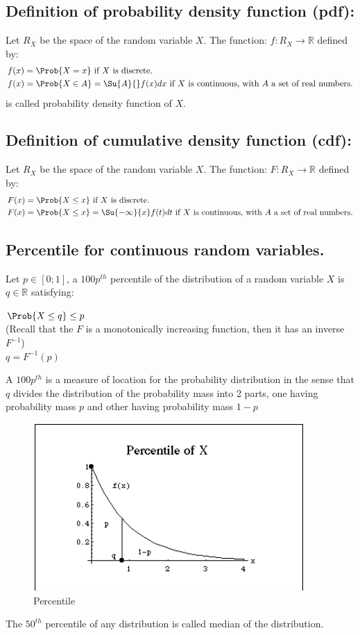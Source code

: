 \subsection{Definition of probability density function (pdf):}
Let $R_{X}$ be the space of the random variable $X$. The function:
$f:R_{X}\rightarrow \mathbb{R}$ defined by:
\begin{align*}
    f(x) &= \Prob{X=x} \text{ if } X \text{ is discrete.}\\
    f(x) &= \Prob{X\in A}=\Su{A}{{}}f(x)dx \text{ if } X \text{ is continuous, with } A
    \text{ a set of real numbers.}
\end{align*}
is called probability density function of $X$.


\subsection{Definition of cumulative density function (cdf):}
Let $R_{X}$ be the space of the random variable $X$. The function:
$F:R_{X}\rightarrow \mathbb{R}$ defined by:\\
\begin{align*}
    F(x) &= \Prob{X\leq x} \text{ if } X \text{ is discrete.}\\
    F(x) &= \Prob{X\leq x}=\Su{-\infty}{x}f(t)dt \text{ if } X \text{ is continuous, 
    with } A \text{ a set of real numbers.}
\end{align*}


\subsection{Percentile for continuous random variables.}
Let $p\in [0;1]$, a $100p^{th}$ percentile of the distribution of a random
variable $X$ is $q\in\mathbb{R}$ satisfying:
\begin{center}
	$\Prob{X\leq q}\leq p$\\
	(Recall that the $F$ is a monotonically increasing function, then it has an 
	inverse $F^{-1}$)\\
	$q = F^{-1}(p)$
\end{center}
A $100p^{th}$ is a measure of location for the probability distribution in
the sense that $q$ divides the distribution of the probability mass into
2 parts, one having probability mass $p$ and other having probability mass
$1-p$
\begin{figure}[H]
	\begin{center}
		\includegraphics[width=.5\textwidth]{./chapters/2_statistics/01_fundamental_probability_concepts/2_images/1percentile.png}
	\end{center}
	\caption{Percentile}
	\label{fig:fig2.1}
\end{figure}
The $50^{th}$ percentile of any distribution is called median of the distribution.
